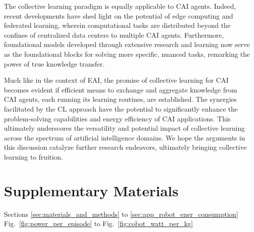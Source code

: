 \documentclass[12pt]{article}
\begin{document}
The collective learning paradigm is equally applicable to CAI agents. Indeed, recent developments have shed light on the potential of edge computing and federated learning, wherein computational tasks are distributed beyond the confines of centralized data centers to multiple CAI agents. Furthermore, foundational models developed through extensive research and learning now serve as the foundational blocks for solving more specific, nuanced tasks, remarking the power of true knowledge transfer.

Much like in the context of EAI, the promise of collective learning for CAI becomes evident if efficient means to exchange and aggregate knowledge from CAI agents, each running its learning routines, are established. The synergies facilitated by the CL approach have the potential to significantly enhance the problem-solving capabilities and energy efficiency of CAI applications. This ultimately underscores the versatility and potential impact of collective learning across the spectrum of artificial intelligence domains. We hope the arguments in this discussion catalyze further research endeavors, ultimately bringing collective learning to fruition.

\section*{Supplementary Materials}
Sections \ref{sec:materials_and_methods} to \ref{sec:app_robot_ener_consumption}\\
Fig.~\ref{fig:power_per_episode} to Fig.~\ref{fig:cobot_watt_per_kg}

\renewcommand\refname{References and Notes}


\end{document}
